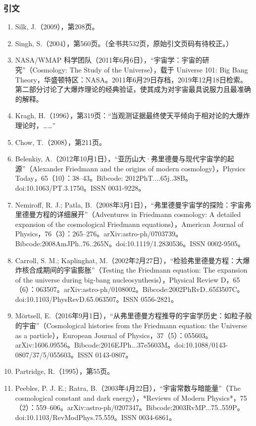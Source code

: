 \subsubsection{引文}
\begin{enumerate}
\item Silk, J.（2009），第208页。  
\item Singh, S.（2004），第560页。（全书共532页，原始引文页码有待校正。）  
\item NASA/WMAP 科学团队（2011年6月6日），“宇宙学：宇宙的研究”（Cosmology: The Study of the Universe），载于 Universe 101: Big Bang Theory，华盛顿特区：NASA。2011年6月29日存档，2019年12月18日检索。第二部分讨论了大爆炸理论的经典验证，使其成为对宇宙最具说服力且最准确的解释。  
\item Kragh, H.（1996），第319页：“当观测证据最终使天平倾向于相对论的大爆炸理论时，……”  
\item Chow, T.（2008），第211页。  
\item Belenkiy, A.（2012年10月1日），“亚历山大·弗里德曼与现代宇宙学的起源”（Alexander Friedmann and the origins of modern cosmology），Physics Today，65（10）：38–43。Bibcode: 2012PhT....65j..38B。doi:10.1063/PT.3.1750。ISSN 0031-9228。  
\item Nemiroff, R. J.; Patla, B.（2008年3月1日），“弗里德曼宇宙学的探险：宇宙弗里德曼方程的详细展开”（Adventures in Friedmann cosmology: A detailed expansion of the cosmological Friedmann equations），American Journal of Physics，76（3）：265–276。arXiv:astro-ph/0703739。Bibcode:2008AmJPh..76..265N。doi:10.1119/1.2830536。ISSN 0002-9505。  
\item Carroll, S. M.; Kaplinghat, M.（2002年2月27日），“检验弗里德曼方程：大爆炸核合成期间的宇宙膨胀”（Testing the Friedmann equation: The expansion of the universe during big-bang nucleosynthesis），Physical Review D，65（6）：063507。arXiv:astro-ph/0108002。Bibcode:2002PhRvD..65f3507C。doi:10.1103/PhysRevD.65.063507。ISSN 0556-2821。  
\item Mörtsell, E.（2016年9月1日），“从弗里德曼方程推导的宇宙学历史：如粒子般的宇宙”（Cosmological histories from the Friedmann equation: the Universe as a particle），European Journal of Physics，37（5）：055603。arXiv:1606.09556。Bibcode:2016EJPh...37e5603M。doi:10.1088/0143-0807/37/5/055603。ISSN 0143-0807。  
\item Partridge, R.（1995），第55页。  
\item Peebles, P. J. E.; Ratra, B.（2003年4月22日），“宇宙常数与暗能量”（The cosmological constant and dark energy），*Reviews of Modern Physics*，75（2）：559–606。arXiv:astro-ph/0207347。Bibcode:2003RvMP...75..559P。doi:10.1103/RevModPhys.75.559。ISSN 0034-6861。  

\end{enumerate}
